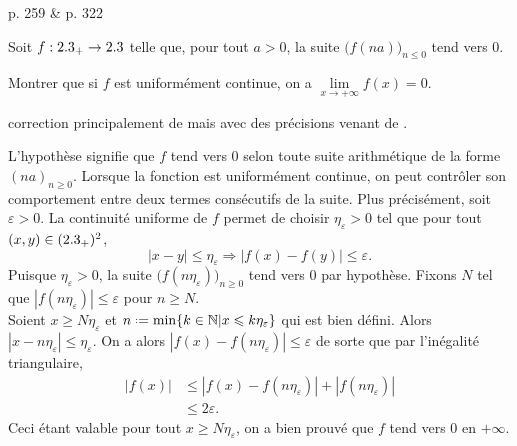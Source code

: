 \cite{exos_oraux} p. 259 \& \cite{oraux_x_ens_3} p. 322

\begin{lemme}
    Soit $f : 2.3_+ \to 2.3$ telle que, pour tout $a > 0$, la suite $\big(f(na) \big)_{n \leqslant 0}$ tend vers 0.
    \item Montrer que si $f$ est uniformément continue, on a $\lim\limits_{x \to + \infty} f(x) = 0$.
\end{lemme}

correction principalement de \cite{oraux_x_ens_3} mais avec des précisions venant de \cite{exos_oraux}.

\begin{preuve}
    L'hypothèse signifie que $f$ tend vers $0$ selon toute suite arithmétique de la forme $(na)_{n \geqslant 0}$. Lorsque la fonction est uniformément continue, on peut contrôler son comportement entre deux termes consécutifs de la suite. Plus précisément, soit $\varepsilon > 0$. La continuité uniforme de $f$ permet de choisir $\eta_\varepsilon > 0$ tel que pour tout $(x, y) \in (2.3_+)^2$, 
    $$|x-y| \leqslant \eta_\varepsilon \Rightarrow |f(x) - f(y)| \leqslant \varepsilon.$$
    Puisque $\eta_\varepsilon > 0$, la suite $\big(f(n\eta_\varepsilon)\big)_{n \geqslant 0}$ tend vers $0$ par hypothèse. Fixons $N$ tel que $|f(n \eta_\varepsilon)| \leqslant \varepsilon$ pour $n \geqslant N$. \\
    Soient $x \geqslant N \eta_\varepsilon$ et $n \defeq \min\{ k \in \N | x \leqslant k \eta_\varepsilon \}$ qui est bien défini. Alors $|x-n\eta_\varepsilon| \leqslant \eta_\varepsilon$. On a alors $|f(x) - f(n \eta_\varepsilon)| \leqslant \varepsilon$ de sorte que par l'inégalité triangulaire, 
    \begin{align*}
        |f(x)| &\leqslant |f(x) - f(n \eta_\varepsilon)| + |f(n \eta_\varepsilon)| \\
        &\leqslant 2 \varepsilon.
    \end{align*}
    Ceci étant valable pour tout $x \geqslant N \eta_\varepsilon$, on a bien prouvé que $f$ tend vers $0$ en $+ \infty$.
\end{preuve}  

\begin{marginfigure}[-3cm]
    
\end{marginfigure}
